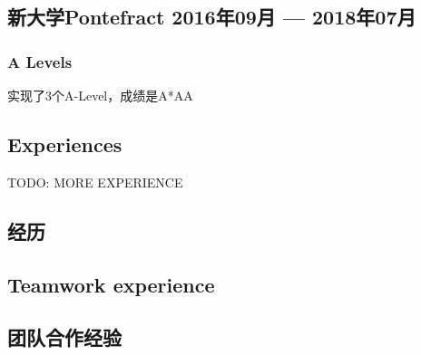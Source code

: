 \begin{xcn}
        \subsection{新大学Pontefract
            \hfill 2016年09月 --- 2018年07月}
            \subsubsection{A Levels}
            实现了3个A-Level，成绩是A*AA
\end{xcn}
\begin{xen}
\end{xen}
\begin{xcn}
\end{xcn}
\begin{xen}
\section{Experiences}
    TODO: MORE EXPERIENCE
\end{xen}
\begin{xcn}
\section{经历}
\end{xcn}
\begin{xen}
    \subsection{Teamwork experience}
\end{xen}
\begin{xcn}
    \subsection{团队合作经验}
\end{xcn}
